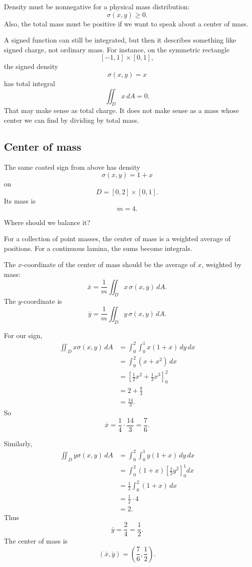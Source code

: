Density must be nonnegative for a physical mass distribution:
\[
    \sigma(x,y)\ge0.
\]
Also, the total mass must be positive if we want to speak about a center of mass.

A signed function can still be integrated, but then it describes something like signed
charge, not ordinary mass.  For instance, on the symmetric rectangle
\[
    [-1,1]\times[0,1],
\]
the signed density
\[
    \sigma(x,y)=x
\]
has total integral
\[
    \iint_D x\,dA=0.
\]
That may make sense as total charge.  It does not make sense as a mass whose center we
can find by dividing by total mass.

\subsection{Center of mass}

The same coated sign from above has density
\[
    \sigma(x,y)=1+x
\]
on
\[
    D=[0,2]\times[0,1].
\]
Its mass is
\[
    m=4.
\]

Where should we balance it?

For a collection of point masses, the center of mass is a weighted average of positions.
For a continuous lamina, the sums become integrals.

The \(x\)-coordinate of the center of mass should be the average of \(x\), weighted by
mass:
\[
    \bar x
    =
    \frac{1}{m}\iint_D x\,\sigma(x,y)\,dA.
\]
The \(y\)-coordinate is
\[
    \bar y
    =
    \frac{1}{m}\iint_D y\,\sigma(x,y)\,dA.
\]

For our sign,
\[
\begin{aligned}
    \iint_D x\sigma(x,y)\,dA
    &=
    \int_0^2\int_0^1 x(1+x)\,dy\,dx\\
    &=
    \int_0^2 (x+x^2)\,dx\\
    &=
    \left[
        \frac12x^2+\frac13x^3
    \right]_0^2\\
    &=
    2+\frac83\\
    &=
    \frac{14}{3}.
\end{aligned}
\]
So
\[
    \bar x=\frac{1}{4}\cdot\frac{14}{3}=\frac76.
\]

Similarly,
\[
\begin{aligned}
    \iint_D y\sigma(x,y)\,dA
    &=
    \int_0^2\int_0^1 y(1+x)\,dy\,dx\\
    &=
    \int_0^2
    (1+x)
    \left[
        \frac12y^2
    \right]_0^1
    dx\\
    &=
    \frac12\int_0^2(1+x)\,dx\\
    &=
    \frac12\cdot4\\
    &=
    2.
\end{aligned}
\]
Thus
\[
    \bar y=\frac{2}{4}=\frac12.
\]
The center of mass is
\[
\boxed{
    \left(\bar x,\bar y\right)=\left(\frac76,\frac12\right).
}
\]


